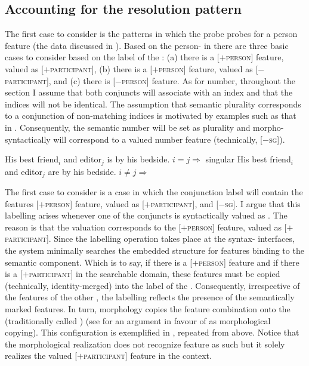 \documentclass[output=paper,modfontsnewtxmath,hidelinks]{langscibook}
\begin{document}
\subsection{Accounting for the resolution pattern}

The first case to consider is the  patterns in which the probe probes for a person feature (the data discussed in ). Based on the person- in  there are three basic cases to consider based on the label of the : (a) there is a [$+$\textsc{person}] feature, valued as [$+$\textsc{participant}], (b) there is a [$+$\textsc{person}] feature, valued as [$-$\textsc{participant}], and (c) there is [$-$\textsc{person}] feature. As for number, throughout the section I assume that both conjuncts will associate with an index and that the indices will not be identical. The assumption that semantic plurality corresponds to a conjunction of non-matching indices is motivated by examples such as that in . Consequently, the semantic number will be set as plurality and morpho-syntactically will correspond to a valued number feature (technically, [$-$\textsc{sg}]).

\ea\label{plural}
\ea His best friend$_i$ and editor$_j$ is by his bedside. \hfill $i=j \Rightarrow$ singular
\ex His best friend$_i$ and editor$_j$ are by his bedside. \hfill $i \neq j \Rightarrow$  
\z\z

\largerpage
\noindent The first case to consider is a case in which the conjunction label will contain the features [$+$\textsc{person}] feature, valued as [$+$\textsc{participant}], and [$-$\textsc{sg}]. I argue that this labelling arises whenever one of the conjuncts is syntactically valued as  . The reason is that the   valuation corresponds to the  [$+$\textsc{person}] feature, valued as [$+$\textsc{participant}]. Since the labelling operation takes place at the syntax- interfaces, the system minimally searches the embedded structure for features binding to the semantic component. Which is to say, if there is a [$+$\textsc{person}] feature and if there is a [$+$\textsc{participant}] in the searchable domain, these features must be copied (technically, identity-merged) into the label of the . Consequently, irrespective of the features of the other , the labelling reflects the presence of the semantically marked features. In turn, morphology copies the feature combination onto the    (traditionally called   ) (see \citealt{bhattwalkow13} for an argument in favour of  as morphological copying). This configuration is exemplified in , repeated from  above. Notice that the morphological realization does not recognize   feature as such but it solely realizes the valued [$+$\textsc{participant}] feature in the  context.
\end{document}
